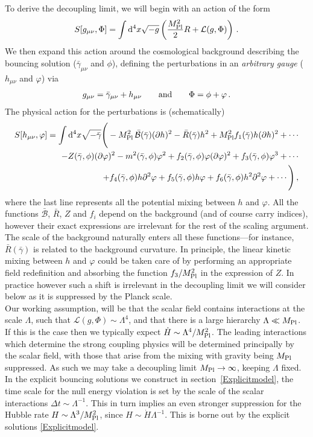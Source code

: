 \documentclass[12pt]{article}
\def\ba{\begin{eqnarray}}
\def\ea{\end{eqnarray}}
\def\mpl{M_{\rm Pl}}
\def\d{\mathrm{d}}
\def\L{\mathcal{L}}
\def\({\left(}
\def\){\right)}
\def\nn{\nonumber}
\def\p{\partial}
\def\mn{_{\mu \nu}}
\def\p{\partial}
\begin{document}
To derive the decoupling limit, we will begin with an action of the form
\ba
\label{eq:Soriginal}
S[g\mn, \Phi]=\int \d^4 x \sqrt{-g}\(\frac{\mpl^2}{2}R +\L(g, \Phi)\)\,.
\ea
We then expand this action around the cosmological background describing the bouncing solution ($\bar \gamma\mn$ and $\phi$), defining the perturbations in an {\it arbitrary gauge} ($h\mn$ and $\varphi$) via
\ba
g\mn=\bar \gamma \mn + h\mn\qquad {\rm and }\qquad
\Phi= \phi+ \varphi\,.
\ea
The physical action for the perturbations is (schematically)
\ba
S[h\mn,\varphi]=  \int \d^4 x \sqrt{-\bar \gamma} \Bigg(- \mpl^2 \, \bar{\mathcal{B}}(\bar \gamma)(\p h)^2 - \bar R(\bar \gamma) h^2 + \mpl^2 f_1(\bar\gamma) h (\p h)^2 +\cdots \\
-  Z(\bar \gamma,  \phi)(\p \varphi)^2 -  m^2 (\bar \gamma,  \phi) \varphi^2 + f_2(\bar \gamma, \phi) \varphi (\p \varphi)^2+ f_3(\bar \gamma, \phi) \varphi^3  + \cdots\nn\\
+ f_4(\bar \gamma,  \phi) h \p^2 \varphi +  f_5(\bar \gamma,  \phi) h  \varphi + f_6(\bar \gamma,  \phi) h^2 \p^2 \varphi + \cdots \nn
\Bigg)\,,
\ea
where the last line represents all the potential mixing between $h$ and $\varphi$. All the functions $\bar{\mathcal{B}}$, $\bar R$, $Z$ and $f_{i}$ depend on the background (and of course carry indices), however their exact expressions are irrelevant for the rest of the scaling argument.  The scale of the background naturally enters all these functions---for instance, $\bar R(\bar \gamma)$ is related to the background curvature. In principle, the linear kinetic mixing between $h$ and $\varphi$ could be taken care of by performing an appropriate field redefinition and absorbing the function $f_3/\mpl^2$ in the expression of $Z$. In practice however such a shift is irrelevant in the decoupling limit we will consider below as it is suppressed by the Planck scale. \\

Our working assumption, will be that the scalar field contains interactions at the scale $\Lambda$, such that $\L(g, \Phi ) \sim \Lambda^4$, and that there is a large hierarchy $\Lambda \ll \mpl$. If this is the case then we typically expect $\dot H \sim \Lambda^4/\mpl^2$. The leading interactions which determine the strong coupling physics will be determined principally by the scalar field, with those that arise from the mixing with gravity being $\mpl$ suppressed. As such we may take a decoupling limit $\mpl \rightarrow \infty$, keeping $\Lambda$ fixed. In the explicit bouncing solutions we construct in section~\ref{Explicitmodel}, the time scale for the null energy violation is set by the scale of the scalar interactions $\Delta t \sim \Lambda^{-1}$. This in turn implies an even stronger suppression for the Hubble rate $H \sim \Lambda^3/\mpl^2$, since $H \sim \dot H \Lambda^{-1}$. This is borne out by the explicit solutions \ref{Explicitmodel}.  \\
\end{document}
